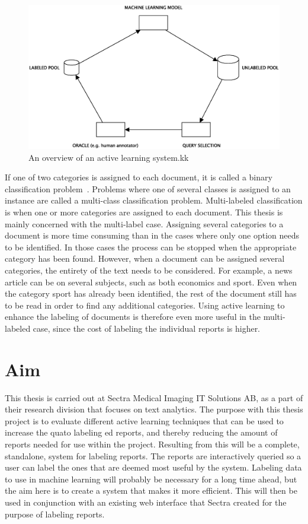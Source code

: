\begin{figure}
    \centering
    \includegraphics[width=\textwidth]{figures/active-learning-model.eps}
    \caption{An overview of an active learning system.kk}
    \label{fig:active-learning-model}
\end{figure}

If one of two categories is assigned to each document, it is called a binary classification problem~\cite{bishop2006pattern}.
Problems where one of several classes is assigned to an instance are called a multi-class classification problem.
Multi-labeled classification is when one or more categories are assigned to each document.
This thesis is mainly concerned with the multi-label case.
Assigning several categories to a document is more time consuming than in the cases where only one option needs to be identified.
In those cases the process can be stopped when the appropriate category has been found.
However, when a document can be assigned several categories, the entirety of the text needs to be considered.
For example, a news article can be on several subjects, such as both economics and sport.
Even when the category sport has already been identified, the rest of the document still has to be read in order to find any additional categories.
Using active learning to enhance the labeling of documents is therefore even more useful in the multi-labeled case, since the cost of labeling the individual reports is higher.

\section{Aim}
\label{sec:aim}

This thesis is carried out at Sectra Medical Imaging IT Solutions AB, as a part of their research division that focuses on text analytics.
The purpose with this thesis project is to evaluate different active learning techniques that can be used to increase the quato labeling  ed reports, and thereby reducing the amount of reports needed for use within the project.
Resulting from this will be a complete, standalone, system for labeling reports.
The reports are interactively queried so a user can label the ones that are deemed most useful by the system.
Labeling data to use in machine learning will probably be necessary for a long time ahead, but the aim here is to create a system that makes it more efficient.
This will then be used in conjunction with an existing web interface that Sectra created for the purpose of labeling reports.

